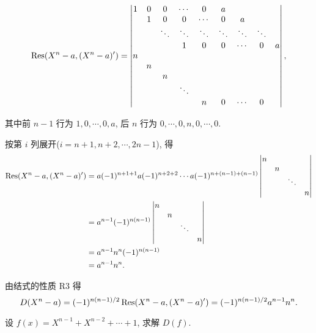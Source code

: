 \documentclass[UTF8]{ctexart}
\begin{document}
\begin{solution}
    \[\operatorname{Res} (X^n-a,(X^n-a)')=\begin{vmatrix}
        1 & 0 & 0 & \cdots & 0 & a \\
        & 1 & 0 & 0 & \cdots & 0 & a \\
        && \ddots & \ddots & \ddots & \ddots & \ddots & \ddots \\
        &&& 1 & 0 & 0 & \cdots & 0 & a \\
        n \\
        & n \\
        && n \\
        &&& \ddots \\
        &&&& n & 0 & \cdots & 0 \\
    \end{vmatrix},\]

    其中前 $n-1$ 行为 $1,0,\cdots,0,a$, 后 $n$ 行为 $0,\cdots,0,n,0,\cdots,0$.

    按第 $i$ 列展开($i=n+1,n+2,\cdots,{2n-1}$), 得
    \begin{align*}
        \operatorname{Res} (X^n-a,(X^n-a)') & =a(-1)^{n+1+1}a(-1)^{n+2+2}\cdots a(-1)^{n+(n-1)+(n-1)}\begin{vmatrix}
            n \\
            & n \\
            && \ddots \\
            &&& n \\
        \end{vmatrix} \\
        & =a^{n-1}(-1)^{n(n-1)}\begin{vmatrix}
            n \\
            & n \\
            && \ddots \\
            &&& n \\
        \end{vmatrix} \\
        & =a^{n-1}n^n(-1)^{n(n-1)} \\
        & =a^{n-1}n^n.
    \end{align*}

    由结式的性质 R3 得
    \[D(X^n-a)=(-1)^{n(n-1)/2}\operatorname{Res} (X^n-a,(X^n-a)')=(-1)^{n(n-1)/2}a^{n-1}n^n.\]
\end{solution}
\begin{exercise}[2.9]
    设 $f(x)=X^{n-1}+X^{n-2}+\cdots+1$, 求解 $D(f)$.
\end{exercise}
\end{document}
